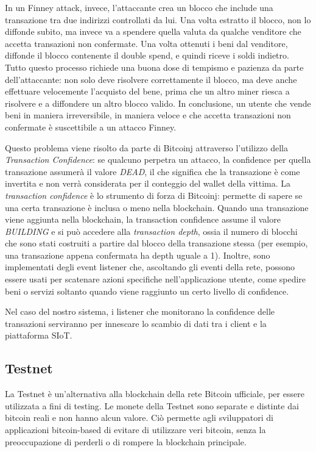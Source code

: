 In un Finney attack, invece, l'attaccante crea un blocco che include una transazione tra due indirizzi controllati da lui. Una volta estratto il blocco, non lo diffonde subito, ma invece va a spendere quella valuta da qualche venditore che accetta transazioni non confermate. Una volta ottenuti i beni dal venditore, diffonde il blocco contenente il double spend, e quindi riceve i soldi indietro. Tutto questo processo richiede una buona dose di tempismo e pazienza da parte dell'attaccante: non solo deve risolvere correttamente il blocco, ma deve anche effettuare velocemente l'acquisto del bene, prima che un altro miner riesca a risolvere e a diffondere un altro blocco valido. In conclusione, un utente che vende beni in maniera irreversibile, in maniera veloce e che accetta transazioni non confermate è suscettibile a un attacco Finney.

Questo problema viene risolto da parte di Bitcoinj attraverso l'utilizzo della \textit{Transaction Confidence}: se qualcuno perpetra un attacco, la confidence per quella transazione assumerà il valore \textit{DEAD}, il che significa che la transazione è come invertita e non verrà considerata per il conteggio del wallet della vittima.
La \textit{transaction confidence} è lo strumento di forza di Bitcoinj: permette di sapere se una certa transazione è inclusa o meno nella blockchain. 
Quando una transazione viene aggiunta nella blockchain, la transaction confidence assume il valore \textit{BUILDING} e si può accedere alla \textit{transaction depth}, ossia il numero di blocchi che sono stati costruiti a partire dal blocco della transazione stessa (per esempio, una transazione appena confermata ha depth uguale a 1).
Inoltre, sono implementati degli event listener che, ascoltando gli eventi della rete, possono essere usati per scatenare azioni specifiche nell'applicazione utente, come spedire beni o servizi soltanto quando viene raggiunto un certo livello di confidence.

Nel caso del nostro sistema, i listener che monitorano la confidence delle transazioni serviranno per innescare lo scambio di dati tra i client e la piattaforma SIoT.


\subsection{Testnet}
\label{c:integr:lib:testnet}

La Testnet è un'alternativa alla blockchain della rete Bitcoin ufficiale, per essere utilizzata a fini di testing. Le monete della Testnet sono separate e distinte dai bitcoin reali e non hanno alcun valore. Ciò permette agli sviluppatori di applicazioni bitcoin-based di evitare di utilizzare veri bitcoin, senza la preoccupazione di perderli o di rompere la blockchain principale.

